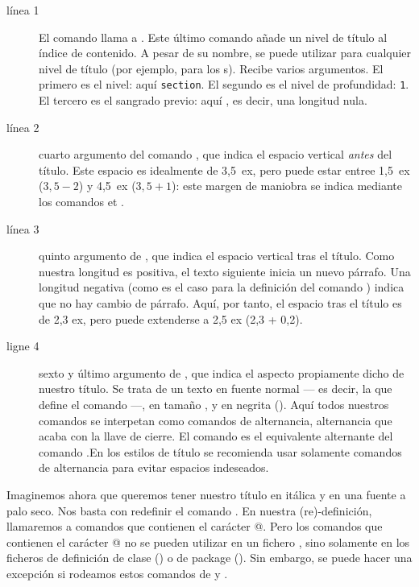 \begin{description}
\item[línea 1]El comando  llama a . Este último comando añade un nivel de título al índice de contenido. A pesar de su nombre, se puede utilizar para cualquier nivel de título (por ejemplo, para los s). Recibe varios argumentos. El primero es el nivel: aquí \verb|section|. El segundo es el nivel de profundidad: \verb|1|. El tercero es el sangrado previo: aquí , es decir, una longitud nula.

\item[línea 2] cuarto argumento del comando , que indica el espacio vertical \emph{antes} del título. Este espacio es idealmente de 3,5~ex, pero puede estar entree 1,5~ex ($3,5 - 2$) y 4,5~ex ($3,5 + 1$):  este margen de maniobra se indica mediante los comandos  et .
\item[línea 3] quinto argumento de , que indica el espacio vertical tras el título. Como nuestra longitud es positiva, el texto siguiente inicia un nuevo párrafo. Una longitud negativa (como es el caso para la definición del comando ) indica que no hay cambio de párrafo. Aquí, por tanto, el espacio tras el título es de 2,3 ex, pero puede extenderse a 2,5 ex (2,3 + 0,2).
\item[ligne 4] sexto y último argumento de , que indica el aspecto propiamente dicho de nuestro título. Se trata de un texto en fuente normal --- es decir, la que define el comando  ---, en tamaño , y en negrita (). Aquí todos nuestros comandos se interpetan como comandos de alternancia, alternancia que acaba con la llave de cierre. El comando  es el equivalente alternante del comando .En los estilos de título se recomienda usar solamente comandos de alternancia para evitar espacios indeseados.\label{bfseries}
\end{description}

Imaginemos ahora que queremos tener nuestro título en itálica y en una fuente a palo seco. Nos basta con redefinir el comando .
En nuestra (re)-definición, llamaremos a comandos que contienen el carácter @. Pero los comandos que contienen el carácter @ no se pueden utilizar en un fichero , sino solamente en los ficheros de definición de clase () o de package (). Sin embargo, se puede hacer una excepción si rodeamos estos comandos  de  y .

